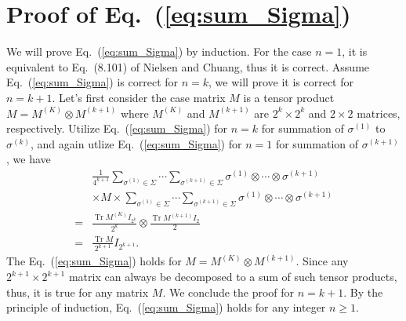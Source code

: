 \documentclass{article}
\DeclareMathOperator{\Tr}{Tr}
\begin{document}
\section{Proof of Eq.~(\ref{eq:sum_Sigma})}
We will prove Eq.~(\ref{eq:sum_Sigma}) by induction.
For the case $n=1$, it is equivalent to Eq.~(8.101) of Nielsen and Chuang,
thus it is correct.
Assume Eq.~(\ref{eq:sum_Sigma}) is correct for $n = k$, we will prove it
is correct for $n = k+1$. Let's first consider the case matrix $M$ is
a tensor product $M = M^{(K)}\otimes M^{(k+1)}$ where $M^{(K)}$ and $M^{(k+1)}$
are $2^k\times2^k$ and $2\times2$ matrices, respectively. Utilize
Eq.~(\ref{eq:sum_Sigma}) for $n = k$ for summation of $\sigma^{(1)}$
to $\sigma^{(k)}$, and again utlize Eq.~(\ref{eq:sum_Sigma}) for $n = 1$
for summation of $\sigma^{(k+1)}$, we have
\begin{align}
  & \frac{1}{4^{k+1}}\sum_{\sigma^{(1)}\in\Sigma}\cdots\sum_{\sigma^{(k+1)}\in\Sigma}
  \sigma^{(1)}\otimes\cdots\otimes\sigma^{(k+1)} \nonumber\\
  & \times M\times \sum_{\sigma^{(1)}\in\Sigma}\cdots\sum_{\sigma^{(k+1)}\in\Sigma}
  \sigma^{(1)}\otimes\cdots\otimes\sigma^{(k+1)} \nonumber\\
  =& \frac{\Tr M^{(K)}I_{2^k}}{2^k}\otimes\frac{\Tr M^{(k+1)}I_2}{2}
  \nonumber\\
  =&\frac{\Tr M}{2^{k+1}}I_{2^{k+1}}.
\end{align}
The Eq.~(\ref{eq:sum_Sigma}) holds for $M = M^{(K)}\otimes M^{(k+1)}$.
Since any $2^{k+1}\times2^{k+1}$ matrix can always be decomposed to a
sum of such tensor products, thus, it is true for any matrix $M$.
We conclude the proof for $n = k+1$.  By the principle of induction,
Eq.~(\ref{eq:sum_Sigma}) holds for any integer $n \ge 1$.



\end{document}

